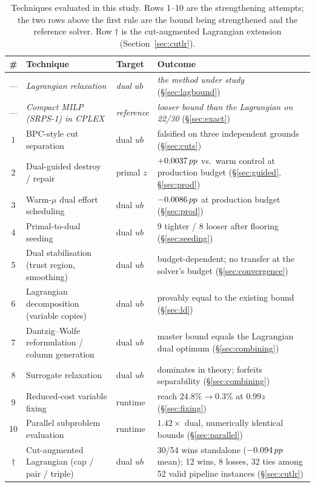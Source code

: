 \begin{table}[htbp]
\centering
\small
\caption{Techniques evaluated in this study. Rows 1--10 are the strengthening attempts; the two rows above the first rule are the bound being strengthened and the reference solver. Row $\dagger$ is the cut-augmented Lagrangian extension (Section~\ref{sec:cutlr}).}
\label{tab:coverage}
\begin{tabular}{clp{1.8cm}p{6.5cm}}
\toprule
\# & Technique & Target & Outcome \\
\midrule
--- & \emph{Lagrangian relaxation} & \emph{dual $ub$} & \emph{the method under study} (\S\ref{sec:lagbound}) \\
--- & \emph{Compact MILP (SRPS-1) in CPLEX} & \emph{reference} & \emph{looser bound than the Lagrangian on 22/30} (\S\ref{sec:exact}) \\
\midrule
1 & BPC-style cut separation & dual $ub$ & falsified on three independent grounds (\S\ref{sec:cuts}) \\
2 & Dual-guided destroy / repair & primal $z$ & $+0.0037\,pp$ vs.\ warm control at production budget (\S\ref{sec:guided}, \S\ref{sec:prod}) \\
3 & Warm-$\mu$ dual effort scheduling & dual $ub$ & $-0.0086\,pp$ at production budget (\S\ref{sec:prod}) \\
4 & Primal-to-dual seeding & dual $ub$ & 9 tighter / 8 looser after flooring (\S\ref{sec:seeding}) \\
5 & Dual stabilisation (trust region, smoothing) & dual $ub$ & budget-dependent; no transfer at the solver's budget (\S\ref{sec:convergence}) \\
6 & Lagrangian decomposition (variable copies) & dual $ub$ & provably equal to the existing bound (\S\ref{sec:ld}) \\
7 & Dantzig--Wolfe reformulation / column generation & dual $ub$ & master bound equals the Lagrangian dual optimum (\S\ref{sec:combining}) \\
8 & Surrogate relaxation & dual $ub$ & dominates in theory; forfeits separability (\S\ref{sec:combining}) \\
9 & Reduced-cost variable fixing & runtime & reach $24.8\%\to0.3\%$ at $0.99z$ (\S\ref{sec:fixing}) \\
10 & Parallel subproblem evaluation & runtime & $\mathbf{1.42\times}$ dual, numerically identical bounds (\S\ref{sec:parallel}) \\
\midrule
$\dagger$ & Cut-augmented Lagrangian (cap / pair / triple) & dual $ub$ & 30/54 wins standalone ($-0.094\,pp$ mean); 12 wins, 8 losses, 32 ties among 52 valid pipeline instances (\S\ref{sec:cutlr}) \\
\bottomrule
\end{tabular}
\end{table}
